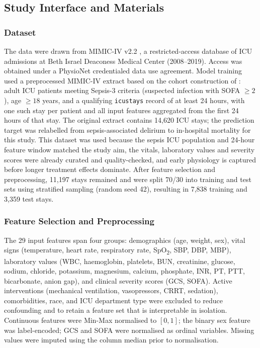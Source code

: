 \documentclass[12pt, a4paper]{article}
\begin{document}
\subsection{Study Interface and Materials}
\label{sec:edge_patient}
\subsubsection{Dataset}

The data were drawn from MIMIC-IV v2.2 \citep{johnson2023mimic}, a
restricted-access database of ICU admissions at Beth Israel Deaconess
Medical Center (2008--2019). Access was obtained under a PhysioNet
credentialed data use agreement. Model training used a preprocessed MIMIC-IV extract based on the cohort
construction of \citet{zhang2023}: adult ICU patients meeting Sepsis-3
criteria (suspected infection with SOFA $\geq 2$), age $\geq 18$ years,
and a qualifying \texttt{icustays} record of at least 24 hours, with
one such stay per patient and all input features aggregated from the
first 24 hours of that stay. The original extract contains 14{,}620 ICU
stays; the prediction target was relabelled from sepsis-associated
delirium to in-hospital mortality for this study. This dataset was used
because the sepsis ICU population and 24-hour feature window matched the
study aim, the vitals, laboratory values and severity scores were already
curated and quality-checked, and early physiology is captured before
longer treatment effects dominate. After feature selection and
preprocessing, 11{,}197 stays remained and were split 70/30 into
training and test sets using stratified sampling (random seed 42),
resulting in 7{,}838 training and 3{,}359 test stays.

\subsubsection{Feature Selection and Preprocessing}

The 29 input features span four groups: demographics (age, weight, sex),
vital signs (temperature, heart rate, respiratory rate,
SpO\textsubscript{2}, SBP, DBP, MBP), laboratory values (WBC,
haemoglobin, platelets, BUN, creatinine, glucose, sodium, chloride,
potassium, magnesium, calcium, phosphate, INR, PT, PTT, bicarbonate,
anion gap), and clinical severity scores (GCS, SOFA). Active
interventions (mechanical ventilation, vasopressors, CRRT, sedation),
comorbidities, race, and ICU department type were excluded to reduce
confounding and to retain a feature set that is interpretable in
isolation. Continuous features were Min-Max normalised to $[0, 1]$;
the binary sex feature was label-encoded; GCS and SOFA were normalised
as ordinal variables. Missing values were imputed using the column
median prior to normalisation.
\end{document}
